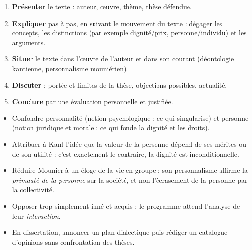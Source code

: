 \documentclass[11pt]{article}
\newcommand{\cle}[1]{{\popxbold\color{popdark}#1}}
\begin{document}
\begin{methode}
\begin{enumerate}
  \item \textbf{Présenter} le texte : auteur, œuvre, thème, thèse défendue.
  \item \textbf{Expliquer} pas à pas, en suivant le mouvement du texte : dégager les concepts, les distinctions (par exemple dignité/prix, personne/individu) et les arguments.
  \item \textbf{Situer} le texte dans l'œuvre de l'auteur et dans son courant (déontologie kantienne, personnalisme mouniérien).
  \item \textbf{Discuter} : portée et limites de la thèse, objections possibles, actualité.
  \item \textbf{Conclure} par une évaluation personnelle et justifiée.
\end{enumerate}
\end{methode}

\begin{attention}
\begin{itemize}
  \item Confondre \cle{personnalité} (notion psychologique : ce qui singularise) et \cle{personne} (notion juridique et morale : ce qui fonde la dignité et les droits).
  \item Attribuer à Kant l'idée que la valeur de la personne dépend de ses mérites ou de son utilité : c'est exactement le contraire, la dignité est inconditionnelle.
  \item Réduire Mounier à un éloge de la vie en groupe : son personnalisme affirme la \emph{primauté de la personne} sur la société, et non l'écrasement de la personne par la collectivité.
  \item Opposer trop simplement inné et acquis : le programme attend l'analyse de leur \emph{interaction}.
  \item En dissertation, annoncer un plan dialectique puis rédiger un catalogue d'opinions sans confrontation des thèses.
\end{itemize}
\end{attention}
\end{document}
